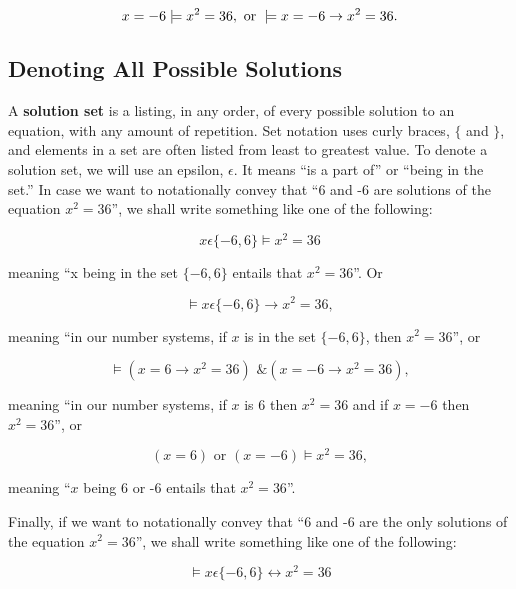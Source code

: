 \documentclass{book}
\theoremstyle{definition}
\begin{document}
\begin{equation}\label{(3.5)}
x=-6\models x^2=36,\hbox{ or  }\models x=-6 \rightarrow x^2=36.
\end{equation}

\subsection{Denoting All Possible Solutions}
A \textbf{solution set} is a listing, in any order, of every possible solution to an equation, with any amount of repetition. Set notation uses curly braces, $\{$ and $\}$, and elements in a set are often listed from least to greatest value. To denote a solution set, we will use an epsilon, $\epsilon$. It means ``is a part of'' or ``being in the set.''
In case we want to notationally convey that ``6 and -6 are solutions of the equation $x^2=36$'', we shall write something like one of the following:

\begin{equation}
\label{(3.6)}
x\epsilon\{-6,6\} \vDash x^2=36
\end{equation}

meaning ``x being in the set $\{-6,6\}$ entails that $x^2=36$''. Or

\begin{equation}
\label{(3.7)}
\vDash x\epsilon\{-6,6\} \rightarrow x^2=36,
\end{equation}

meaning ``in our number systems, if $x$ is in the set $\{-6,6\}$, then $x^2=36$'', or

\begin{equation}
\label{(3.8)}
\vDash (x=6 \rightarrow x^2=36) \text{ \& } (x=-6 \rightarrow x^2=36),
\end{equation}

meaning ``in our number systems, if $x$ is 6 then $x^2=36$ and if $x=-6$ then $x^2=36$'', or

\begin{equation}
\label{(3.9)}
(x=6) \text{ or } (x=-6)  \vDash x^2=36,
\end{equation}

meaning ``$x$ being 6 or -6 entails that $x^2=36$''.

Finally, if we want to notationally convey that ``6 and -6 are the only solutions of the equation $x^2=36$'', we shall write something like one of the following:

\begin{equation}
\label{(3.10)}
\vDash x\epsilon\{-6,6\} \leftrightarrow x^2=36
\end{equation}
\end{document}
